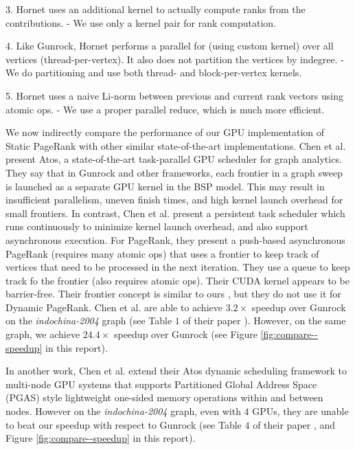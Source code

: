 3. Hornet uses an additional kernel to actually compute ranks from the contributions.
- We use only a kernel pair for rank computation.

4. Like Gunrock, Hornet performs a parallel for (using custom kernel) over all vertices (thread-per-vertex).
It also does not partition the vertices by indegree.
- We do partitioning and use both thread- and block-per-vertex kernels.

5. Hornet uses a naive Li-norm between previous and current rank vectors using atomic ops.
- We use a proper parallel reduce, which is much more efficient.


We now indirectly compare the performance of our GPU implementation of Static PageRank with other similar state-of-the-art implementations. Chen et al. \cite{chen2022atos} present Atos, a state-of-the-art task-parallel GPU scheduler for graph analytics. They say that in Gunrock and other frameworks, each frontier in a graph sweep is launched as a separate GPU kernel in the BSP model. This may result in insufficient parallelism, uneven finish times, and high kernel launch overhead for small frontiers. In contrast, Chen et al. present a persistent task scheduler which runs continuously to minimize kernel launch overhead, and also support asynchronous execution. For PageRank, they present a push-based asynchronous PageRank (requires many atomic ops) that uses a frontier to keep track of vertices that need to be processed in the next iteration. They use a queue to keep track fo the frontier (also requires atomic ops). Their CUDA kernel appears to be barrier-free. Their frontier concept is similar to ours \cite{sahu2024df}, but they do not use it for Dynamic PageRank. Chen et al. are able to achieve $3.2\times$ speedup over Gunrock on the \textit{indochina-2004} graph (see Table $1$ of their paper \cite{chen2022atos}). However, on the same graph, we achieve $24.4\times$ speedup over Gunrock (see Figure \ref{fig:compare--speedup} in this report).

In another work, Chen et al. \cite{chen2022scalable} extend their Atos dynamic scheduling framework to multi-node GPU systems that supports Partitioned Global Address Space (PGAS) style lightweight one-sided memory operations within and between nodes. However on the \textit{indochina-2004} graph, even with $4$ GPUs, they are unable to beat our speedup with respect to Gunrock (see Table $4$ of their paper \cite{chen2022scalable}, and Figure \ref{fig:compare--speedup} in this report).

